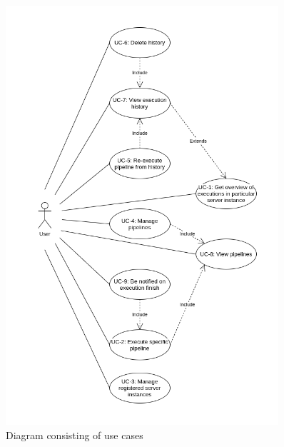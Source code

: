 \begin{figure}\centering
	\includegraphics[width=0.9\textwidth]{pics/bc-uc.png}
	\caption[Use cases]{Diagram consisting of use cases}\label{fig:uc}
\end{figure}
